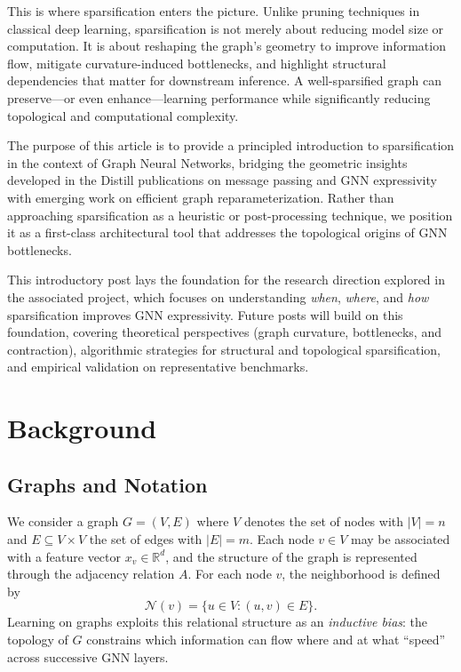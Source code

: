 \documentclass[letterpaper,12pt]{article}
\begin{document}
This is where sparsification enters the picture. Unlike pruning techniques in classical deep learning, sparsification is not merely about reducing model size or computation. It is about reshaping the graph’s geometry to improve information flow, mitigate curvature-induced bottlenecks, and highlight structural dependencies that matter for downstream inference. A well-sparsified graph can preserve---or even enhance---learning performance while significantly reducing topological and computational complexity.

The purpose of this article is to provide a principled introduction to sparsification in the context of Graph Neural Networks, bridging the geometric insights developed in the Distill publications on message passing and GNN expressivity with emerging work on efficient graph reparameterization. Rather than approaching sparsification as a heuristic or post-processing technique, we position it as a first-class architectural tool that addresses the topological origins of GNN bottlenecks.

This introductory post lays the foundation for the research direction explored in the associated project, which focuses on understanding \textit{when}, \textit{where}, and \textit{how} sparsification improves GNN expressivity. Future posts will build on this foundation, covering theoretical perspectives (graph curvature, bottlenecks, and contraction), algorithmic strategies for structural and topological sparsification, and empirical validation on representative benchmarks.

\section{Background}

\subsection{Graphs and Notation}

We consider a graph \( G = (V, E) \) where \(V\) denotes the set of nodes with \(|V| = n\) and \(E \subseteq V \times V\) the set of edges with \(|E| = m\). Each node \(v \in V\) may be associated with a feature vector \(x_v \in \mathbb{R}^d\), and the structure of the graph is represented through the adjacency relation \(A\). For each node \(v\), the neighborhood is defined by
\[
\mathcal{N}(v) = \{ u \in V : (u,v) \in E \}.
\]
Learning on graphs exploits this relational structure as an \textit{inductive bias}: the topology of \(G\) constrains which information can flow where and at what ``speed'' across successive GNN layers.
\end{document}
